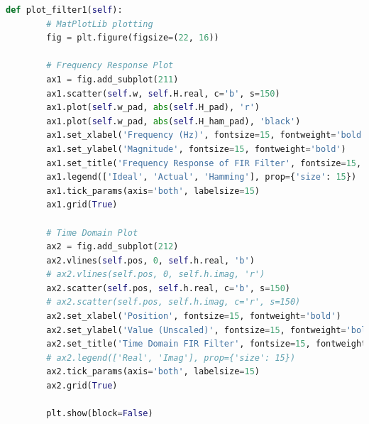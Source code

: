 \documentclass[a4paper, 11pt]{exam}
\begin{document}
\begin{lstlisting}[language=Python]
    def plot_filter1(self):
        # MatPlotLib plotting
        fig = plt.figure(figsize=(22, 16))

        # Frequency Response Plot
        ax1 = fig.add_subplot(211)
        ax1.scatter(self.w, self.H.real, c='b', s=150)
        ax1.plot(self.w_pad, abs(self.H_pad), 'r')
        ax1.plot(self.w_pad, abs(self.H_ham_pad), 'black')
        ax1.set_xlabel('Frequency (Hz)', fontsize=15, fontweight='bold')
        ax1.set_ylabel('Magnitude', fontsize=15, fontweight='bold')
        ax1.set_title('Frequency Response of FIR Filter', fontsize=15, fontweight='bold')
        ax1.legend(['Ideal', 'Actual', 'Hamming'], prop={'size': 15})
        ax1.tick_params(axis='both', labelsize=15)
        ax1.grid(True)

        # Time Domain Plot
        ax2 = fig.add_subplot(212)
        ax2.vlines(self.pos, 0, self.h.real, 'b')
        # ax2.vlines(self.pos, 0, self.h.imag, 'r')
        ax2.scatter(self.pos, self.h.real, c='b', s=150)
        # ax2.scatter(self.pos, self.h.imag, c='r', s=150)
        ax2.set_xlabel('Position', fontsize=15, fontweight='bold')
        ax2.set_ylabel('Value (Unscaled)', fontsize=15, fontweight='bold')
        ax2.set_title('Time Domain FIR Filter', fontsize=15, fontweight='bold')
        # ax2.legend(['Real', 'Imag'], prop={'size': 15})
        ax2.tick_params(axis='both', labelsize=15)
        ax2.grid(True)

        plt.show(block=False)
\end{lstlisting}
\newpage
\end{document}
